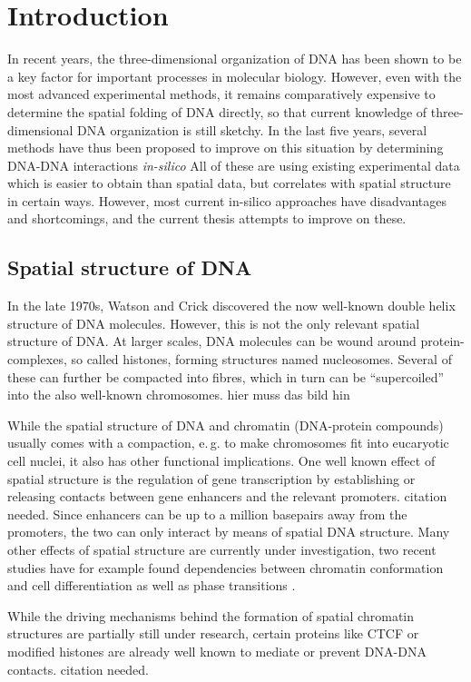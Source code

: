 \section{Introduction}
In recent years, the three-dimensional organization of DNA has been shown to 
be a key factor for important processes in molecular biology.
However, even with the most advanced experimental methods, 
it remains comparatively expensive to determine the spatial folding of DNA directly,
so that current knowledge of three-dimensional DNA organization is still sketchy.
In the last five years, several methods have thus been proposed to improve on this situation
by determining DNA-DNA interactions \emph{in-silico}
All of these are using existing experimental data which is easier to obtain than spatial data, but correlates with spatial structure in certain ways.
However, most current in-silico approaches have disadvantages and shortcomings,
and the current thesis attempts to improve on these.

\subsection{Spatial structure of DNA}
In the late 1970s, Watson and Crick \xxx discovered the now well-known double helix structure of DNA molecules.
However, this is not the only relevant spatial structure of DNA. 
At larger scales, DNA molecules can be wound around protein-complexes, so called histones, forming structures named nucleosomes.
Several of these can further be compacted into fibres, which in turn can be ``supercoiled'' into the also well-known chromosomes.
\xxx hier muss das bild hin \xxx

While the spatial structure of DNA and chromatin (DNA-protein compounds) usually comes with a compaction, 
e.\,g. to make chromosomes fit into eucaryotic cell nuclei,
it also has other functional implications.
One well known effect of spatial structure is the regulation of gene transcription by establishing or releasing contacts
between gene enhancers and the relevant promoters. \xxx citation needed.
Since enhancers can be up to a million basepairs away from the promoters, 
the two can only interact by means of spatial DNA structure.
Many other effects of spatial structure are currently under investigation, 
two recent studies have for example found dependencies between chromatin conformation 
and cell differentiation as well as phase transitions \cite{Chathoth2019,Zhang2019b}.

While the driving mechanisms behind the formation of spatial chromatin structures are partially still under research,
certain proteins like CTCF or modified histones are already well known to mediate or prevent DNA-DNA contacts. \xxx citation needed.

